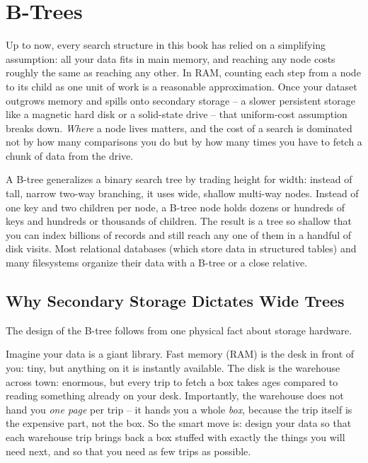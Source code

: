 \chapter{B-Trees}

Up to now, every search structure in this book has relied on a simplifying
assumption: all your data fits in main memory, and reaching any node costs roughly
the same as reaching any other. In RAM, counting each step from a node to its child as one unit
of work is a reasonable approximation. Once your dataset outgrows memory and
spills onto secondary storage -- a slower persistent storage like a magnetic hard disk or a solid-state drive -- that
uniform-cost assumption breaks down. \emph{Where} a node lives matters, and the cost of a
search is dominated not by how many comparisons you do but by how many times you
have to fetch a chunk of data from the drive.

A B-tree generalizes a binary search tree by trading height for width:
instead of tall, narrow two-way branching, it uses wide, shallow multi-way nodes. Instead of
one key and two children per node, a B-tree node holds dozens or hundreds of keys
and hundreds or thousands of children. The result is a tree so shallow that you
can index billions of records and still reach any one of them in a handful of
disk visits. Most relational databases (which store data in structured tables) and many filesystems organize
their data with a B-tree or a close relative.

\section{Why Secondary Storage Dictates Wide Trees}

The design of the B-tree follows from one physical fact about storage hardware.

\begin{intuitionbox}
Imagine your data is a giant library. Fast memory (RAM) is the desk in front of
you: tiny, but anything on it is instantly available. The disk is the warehouse
across town: enormous, but every trip to fetch a box takes ages compared to
reading something already on your desk. Importantly, the warehouse does not hand you
\emph{one page} per trip -- it hands you a whole \emph{box}, because the trip
itself is the expensive part, not the box. So the smart move is: design your data
so that each warehouse trip brings back a box stuffed with exactly the things you
will need next, and so that you need as few trips as possible.
\end{intuitionbox}


